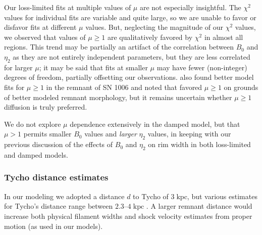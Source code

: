 \documentclass[iop, apj, numberedappendix]{emulateapj}
\newcommand*{\mt}{\mathrm}
\newcommand*{\unit}[1]{\;\mt{#1}}  %
\begin{document}
Our loss-limited fits at multiple values of $\mu$ are not especially
insightful.  The $\chi^2$ values for individual fits are variable and quite
large, so we are unable to favor or disfavor fits at different $\mu$ values.
But, neglecting the magnitude of our $\chi^2$ values, we observed that values
of $\mu \geq 1$ are qualitatively favored by $\chi^2$ in almost all regions.
This trend may be partially an artifact of the correlation between $B_0$ and
$\eta_2$ as they are not entirely independent parameters, but they are less
correlated for larger $\mu$; it may be said that fits at smaller $\mu$ may have
fewer (non-integer) degrees of freedom, partially offsetting our observations.
 also found better model fits for $\mu \geq 1$ in the
remnant of SN 1006 and noted that \citet{reynolds2004} favored $\mu \geq 1$ on
grounds of better modeled remnant morphology, but it remains uncertain whether
$\mu \geq 1$ diffusion is truly preferred.

We do not explore $\mu$ dependence extensively in the damped model, but that
$\mu > 1$ permits smaller $B_0$ values and \emph{larger} $\eta_2$ values, in
keeping with our previous discussion of the effects of $B_0$ and $\eta_2$ on
rim width in both loss-limited and damped models.

\subsubsection{Tycho distance estimates}

In our modeling we adopted a distance $d$ to Tycho of $3 \unit{kpc}$, but
various estimates for Tycho's distance range between $2.3$--$4 \unit{kpc}$
\citep{hayato2010}.  A larger remnant distance would increase both physical
filament widths and shock velocity estimates from proper motion (as used in our
models).
\end{document}
